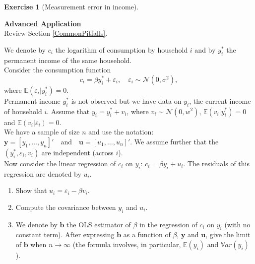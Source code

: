 \documentclass[
  11pt,
]{book}
\theoremstyle{definition}
\theoremstyle{definition}
\theoremstyle{definition}
\newtheorem{exercise}{Exercise}[chapter]
\theoremstyle{definition}
\theoremstyle{remark}
\begin{document}

\begin{exercisebox}

\begin{exercise}[Measurement error in income]
\protect\hypertarget{exr:regressions-measurement-error}{}\label{exr:regressions-measurement-error}

\textbf{Advanced \textbar{} Application}\\
Review Section \ref{CommonPitfalls}.

We denote by \(c_i\) the logarithm of consumption by household \(i\) and by \(y_i^*\) the permanent income of the same household.\\
Consider the consumption function \[c_i = \beta y_i^* + \varepsilon_i, \quad \varepsilon_i \sim \mathcal{N}(0, \sigma^2),\] where \(\mathbb{E}(\varepsilon_i | y_i^*) = 0.\)\\
Permanent income \(y_i^*\) is not observed but we have data on \(y_i\), the current income of household \(i\). Assume that \(y_i = y_i^* + v_i\), where \(v_i \sim \mathcal{N}(0, w^2)\), \(\mathbb{E}(v_i | y_i^*) = 0\) and \(\mathbb{E}(v_i | \varepsilon_i) = 0\).\\
We have a sample of size \(n\) and use the notation: \(\mathbf{y} = [y_1, \dots, y_n]' \quad \text{and} \quad \mathbf{u} = [u_1, \dots, u_n]'\). We assume further that the \((y_i^*, \varepsilon_i, v_i)\) are independent (across \(i\)).\\
Now consider the linear regression of \(c_i\) on \(y_i\): \(c_i = \beta y_i + u_i\). The residuals of this regression are denoted by \(u_i\).

\begin{enumerate}
\def\labelenumi{\arabic{enumi}.}
\item
  Show that \(u_i = \varepsilon_i - \beta v_i\).
\item
  Compute the covariance between \(y_i\) and \(u_i\).
\item
  We denote by \(\mathbf{b}\) the OLS estimator of \(\beta\) in the regression of \(c_i\) on \(y_i\) (with no constant term). After expressing \(\mathbf{b}\) as a function of \(\beta\), \(\mathbf{y}\) and \(\mathbf{u}\), give the limit of \(\mathbf{b}\) when \(n \to \infty\) (the formula involves, in particular, \(\mathbb{E}(y_i)\) and \(\mathbb{V}ar(y_i)\)).
\end{enumerate}

\end{exercise}

\end{exercisebox}
\end{document}

